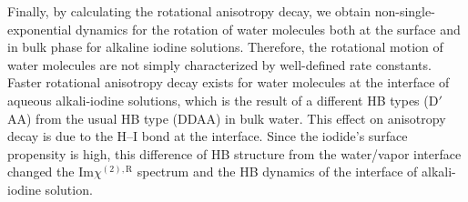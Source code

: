 Finally, by calculating the rotational anisotropy decay, we obtain non-single-exponential dynamics 
for the rotation of water molecules both at the surface and in bulk phase for alkaline 
iodine solutions. Therefore, the rotational motion of water molecules are not simply characterized by well-defined rate constants. 
Faster rotational anisotropy decay exists for water molecules at the interface of aqueous alkali-iodine solutions, 
which is the result of a different HB types (D$'$AA) from the usual HB type (DDAA) in bulk water. 
This effect on anisotropy decay is due to the H--I bond at the interface. Since the iodide's surface propensity is high, 
this difference of HB structure from the water/vapor interface changed the Im$\chi^{(2),\text{R}}$ spectrum and the HB dynamics 
of the interface of alkali-iodine solution. 




